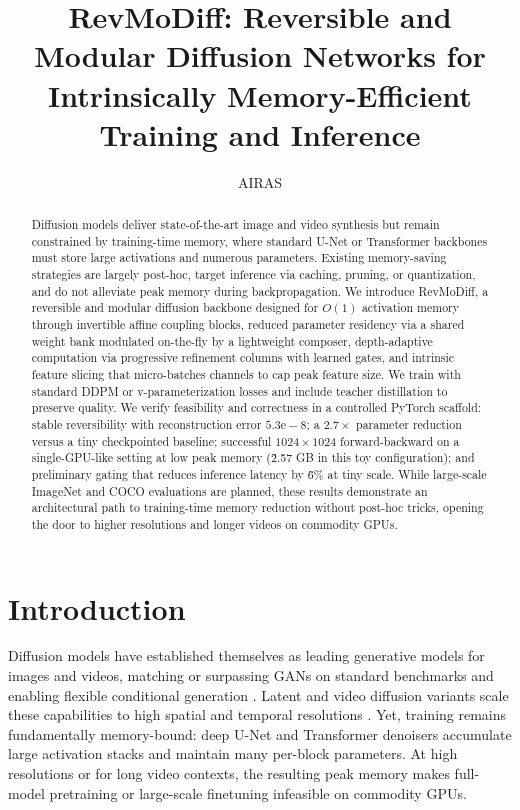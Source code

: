 \documentclass{article}
\title{RevMoDiff: Reversible and Modular Diffusion Networks for Intrinsically Memory-Efficient Training and Inference}
\author{AIRAS}
\begin{document}
\maketitle

\begin{abstract}
Diffusion models deliver state-of-the-art image and video synthesis but remain constrained by training-time memory, where standard U-Net or Transformer backbones must store large activations and numerous parameters. Existing memory-saving strategies are largely post-hoc, target inference via caching, pruning, or quantization, and do not alleviate peak memory during backpropagation. We introduce RevMoDiff, a reversible and modular diffusion backbone designed for $O(1)$ activation memory through invertible affine coupling blocks, reduced parameter residency via a shared weight bank modulated on-the-fly by a lightweight composer, depth-adaptive computation via progressive refinement columns with learned gates, and intrinsic feature slicing that micro-batches channels to cap peak feature size. We train with standard DDPM or v-parameterization losses and include teacher distillation to preserve quality. We verify feasibility and correctness in a controlled PyTorch scaffold: stable reversibility with reconstruction error $5.3\mathrm{e}{-}8$; a $2.7\times$ parameter reduction versus a tiny checkpointed baseline; successful $1024\times 1024$ forward-backward on a single-GPU-like setting at low peak memory (\~2.57 GB in this toy configuration); and preliminary gating that reduces inference latency by \~6\% at tiny scale. While large-scale ImageNet and COCO evaluations are planned, these results demonstrate an architectural path to training-time memory reduction without post-hoc tricks, opening the door to higher resolutions and longer videos on commodity GPUs.
\end{abstract}



\section{Introduction}
Diffusion models have established themselves as leading generative models for images and videos, matching or surpassing GANs on standard benchmarks and enabling flexible conditional generation \cite{dhariwal-2021-diffusion}. Latent and video diffusion variants scale these capabilities to high spatial and temporal resolutions \cite{blattmann-2023-align}. Yet, training remains fundamentally memory-bound: deep U-Net and Transformer denoisers accumulate large activation stacks and maintain many per-block parameters. At high resolutions or for long video contexts, the resulting peak memory makes full-model pretraining or large-scale finetuning infeasible on commodity GPUs.
\end{document}
